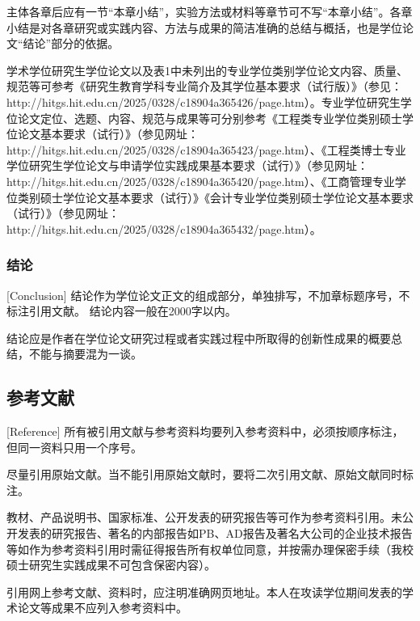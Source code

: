 主体各章后应有一节“本章小结”，实验方法或材料等章节可不写“本章小结”。各章小结是对各章研究或实践内容、方法与成果的简洁准确的总结与概括，也是学位论文“结论”部分的依据。

学术学位研究生学位论文以及表1中未列出的专业学位类别学位论文内容、质量、规范等可参考《研究生教育学科专业简介及其学位基本要求（试行版）》（参见：http://hitgs.hit.edu.cn/2025/0328/c18904a365426/page.htm）。专业学位研究生学位论文定位、选题、内容、规范与成果等可分别参考《工程类专业学位类别硕士学位论文基本要求（试行）》（参见网址：http://hitgs.hit.edu.cn/2025/0328/c18904a365423/page.htm）、《工程类博士专业学位研究生学位论文与申请学位实践成果基本要求（试行）》（参见网址：http://hitgs.hit.edu.cn/2025/0328/c18904a365420/page.htm）、《工商管理专业学位类别硕士学位论文基本要求（试行）》《会计专业学位类别硕士学位论文基本要求（试行）》（参见网址：http://hitgs.hit.edu.cn/2025/0328/c18904a365432/page.htm）。


\subsubsection{结论}[Conclusion]
结论作为学位论文正文的组成部分，单独排写，不加章标题序号，不标注引用文献。
结论内容一般在\num{2000}字以内。

结论应是作者在学位论文研究过程或者实践过程中所取得的创新性成果的概要总结，不能与摘要混为一谈。


\subsection{参考文献}[Reference]
所有被引用文献与参考资料均要列入参考资料中，必须按顺序标注，但同一资料只用一个序号。



尽量引用原始文献。当不能引用原始文献时，要将二次引用文献、原始文献同时标注。

教材、产品说明书、国家标准、公开发表的研究报告等可作为参考资料引用。未公开发表的研究报告、著名的内部报告如PB、AD报告及著名大公司的企业技术报告等如作为参考资料引用时需征得报告所有权单位同意，并按需办理保密手续（我校硕士研究生实践成果不可包含保密内容）。

引用网上参考文献、资料时，应注明准确网页地址。本人在攻读学位期间发表的学术论文等成果不应列入参考资料中。






